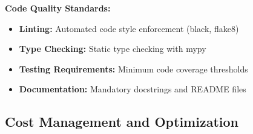 \textbf{Code Quality Standards:}
\begin{itemize}
    \item \textbf{Linting:} Automated code style enforcement (black, flake8)
    \item \textbf{Type Checking:} Static type checking with mypy
    \item \textbf{Testing Requirements:} Minimum code coverage thresholds
    \item \textbf{Documentation:} Mandatory docstrings and README files
\end{itemize}

\subsection{Cost Management and Optimization}

